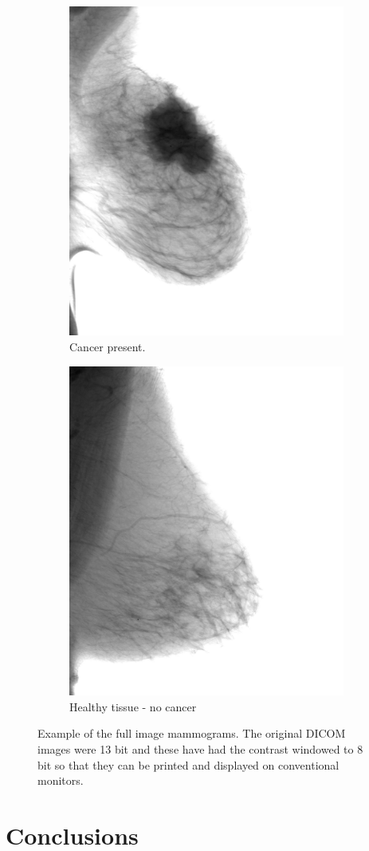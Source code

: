 \documentclass[12pt]{article}
\begin{document}
\begin{figure}
\centering
\begin{subfigure}{.5\textwidth}
  \centering
  \includegraphics[width=.7\linewidth]{cancer.jpg}
  \caption{Cancer present.}
  \label{fig:sub1}
\end{subfigure}%
\begin{subfigure}{.5\textwidth}
  \centering
  \includegraphics[width=.7\linewidth]{noCancer.jpg}
  \caption{Healthy tissue - no cancer}
  \label{fig:sub2}
\end{subfigure}
\caption{Example of the full image mammograms.  The original DICOM images were 13 bit and these have had the contrast windowed to 8 bit so that they can be printed and displayed on conventional monitors.}
\label{fig:test}
\end{figure}

\section{Conclusions}

\newpage
%
\printbibliography
\end{document}

